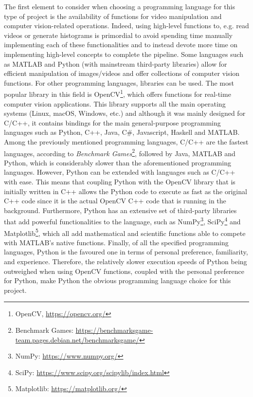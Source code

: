 The first element to consider when choosing a programming language for this type of project is the availability of functions for video manipulation and computer vision-related operations. Indeed, using high-level functions to, e.g. read videos or generate histograms is primordial to avoid spending time manually implementing each of these functionalities and to instead devote more time on implementing high-level concepts to complete the pipeline. Some languages such as MATLAB and Python (with mainstream third-party libraries) allow for efficient manipulation of images/videos and offer collections of computer vision functions. For other programming languages, libraries can be used. The most popular library in this field is OpenCV\footnote{OpenCV, \url{https://opencv.org/}}, which offers functions for real-time computer vision applications. This library supports all the main operating systems (Linux, macOS, Windows, etc.) and although it was mainly designed for C/C++, it contains bindings for the main general-purpose programming languages such as Python, C++, Java, C\#, Javascript, Haskell and MATLAB.\\

Among the previously mentioned programming languages, C/C++ are the fastest languages,
according to \textit{Benchmark Games}\footnote{Benchmark Games: \url{https://benchmarksgame-team.pages.debian.net/benchmarksgame/}}, followed by Java, MATLAB and Python, which is considerably slower than the aforementioned programming languages. However, Python can be extended with languages such as C/C++ with ease. This means that coupling Python with the OpenCV library that is initially written in C++ allows the Python code to execute as fast as the original C++ code since it is the actual OpenCV C++ code that is running in the background. Furthermore, Python has an extensive set of third-party libraries that add powerful functionalities to the language, such as NumPy\footnote{NumPy: \url{https://www.numpy.org/}}, SciPy\footnote{SciPy: \url{https://www.scipy.org/scipylib/index.html}} and Matplotlib\footnote{Matplotlib: \url{https://matplotlib.org/}}, which all add mathematical and scientific functions able to compete with MATLAB's native functions. Finally, of all the specified programming languages, Python is the favoured one in terms of personal preference, familiarity, and experience. Therefore, the relatively slower execution speeds of Python being outweighed when using OpenCV functions, coupled with the personal preference for Python, make Python the obvious programming language choice for this project.\\

